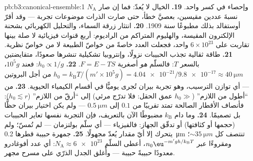 \begin{solution}{pb:b3:canonical-ensemble:1}
وإحصاء في كسر واحد.
\textbf{19.} الخيال لا يُعدّ: فما إن صار $N_{\text{A}}$
نسبةَ عددين مقيسين، بعصيَّ خطأ، حتى صارت الذرات
موضوعات تجربة --- وقد أقرّ أوستفالد بذلك مطبوعًا سنة 1909.
\textbf{20.} انتثار زرقة السماء، والتحليل الكهربائي بشحنة
الإلكترون المقيسة، والهليوم المتراكم من الراديوم: أربع قنوات
فيزيائية لا صلة بينها تقاربت على $6\times10^{23}$ واحد، فجعلت
العدد خاصةً من خواصّ الطبيعة لا من خواصّ نظرية.
\textbf{21.} طاقة ثقالية تجذب الحبيبات نزولًا،
وإنتروبيا تشكيلية تنشرها صعودًا، متقايضتين بالسعر $T$:
فالسلّم \emph{هو} أصغرية $F = E - TS$.
\textbf{22.} $h_0 \propto 1/g$: فعند $10^5g$،
$h_0 = k_{\text{B}}T/(m'\times10^5g) = \num{4.04e-21}/
\num{9.8e-17} \approx \qty{40}{\micro m}$ من أجل البروتين ---
أي توازن الترسيب، وهو تجربة بيران تُجرى يوميًّا في
أقسام الكيمياء الحيوية.
\textbf{23.} من ``أطول من اللازم'' ($h_0 \gg$ عمق الحقل: فلا تدرّج
مرئي) إلى ``أرقّ من اللازم'' ($h_0 \lesssim r$): فأنصاف الأقطار الصالحة تمتد
تقريبًا من $0.1$ إلى $\qty{0.5}{\micro m}$ --- ولم يكن اختيار بيران
حظًّا بل تصميمًا.
\textbf{24.} وما دام $k_{\text{B}}$ مضبوطًا الآن بالتعريف، فإن
التجربة نفسها تعاير الحبيبات (حجمها أو كثافتها) أو
تدقّق الجهاز: فالفيزياء --- أي سلّم بولتزمان --- لم
تُمسّ؛ ولم يتحرك إلا أيّ مقدار يُعدّ مجهولًا.
\textbf{25.} جمهرة حبيبة قطرها \qty{0.2}{\micro m} تنتصف كل
$\sim\qty{35}{\micro m}$؛ ومقروءًا عبر $n_0\eu^{-m'gh/k_{\text{B}}
T}$، أعطى السلّم $N_{\text{A}} \approx \num{6e23}$:
أي عدد أفوغادرو معدودًا حبيبةً حبيبة --- وأُغلق الجدل
الذرّي على مسرح مجهر.
\end{solution}
